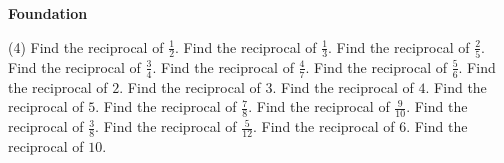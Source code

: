 \documentclass[17pt,a4paper,landscape]{extarticle}
\begin{document}
\sffamily
\boldmath

\boldmath

{\LARGE \textbf{Foundation}}
\begin{tasks}(4)
\task Find the reciprocal of \mbox{$\frac{1}{2}$}.
\task Find the reciprocal of \mbox{$\frac{1}{3}$}.
\task Find the reciprocal of \mbox{$\frac{2}{5}$}.
\task Find the reciprocal of \mbox{$\frac{3}{4}$}.
\task Find the reciprocal of \mbox{$\frac{4}{7}$}.
\task Find the reciprocal of \mbox{$\frac{5}{6}$}.
\task Find the reciprocal of \mbox{$2$}.
\task Find the reciprocal of \mbox{$3$}.
\task Find the reciprocal of \mbox{$4$}.
\task Find the reciprocal of \mbox{$5$}.
\task Find the reciprocal of \mbox{$\frac{7}{8}$}.
\task Find the reciprocal of \mbox{$\frac{9}{10}$}.
\task Find the reciprocal of \mbox{$\frac{3}{8}$}.
\task Find the reciprocal of \mbox{$\frac{5}{12}$}.
\task Find the reciprocal of \mbox{$6$}.
\task Find the reciprocal of \mbox{$10$}.
\end{tasks}
\end{document}
